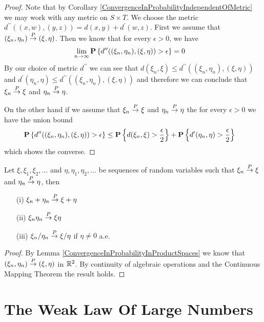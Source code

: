\begin{proof}
Note that by Corollary
\ref{ConvergenceInProbabilityIndependentOfMetric} we may work with any
metric on $S \times T$.  We choose the metric $d^{\prime\prime}((x,w), (y,z)) =
d(x,y) + d^\prime(w,z)$.
First we assume that $(\xi_n, \eta_n) \overset{P}\to (\xi, \eta)$.  Then we
know that for every $\epsilon > 0$, we have
\begin{align*}
\lim_{n \to \infty} \textbf{P}\left \{d^{\prime\prime}((\xi_n,\eta_n),
  (\xi, \eta)) > \epsilon \right \} &= 0
\end{align*}
By our choice of metric $d^{\prime\prime}$ we can see that $d(\xi_n,
\xi) \leq d^{\prime\prime}((\xi_n,\eta_n),
  (\xi, \eta))$ and $d^\prime(\eta_n,\eta) \leq d^{\prime\prime}((\xi_n,\eta_n),
  (\xi, \eta))$ and therefore we can conclude that $\xi_n \overset{P}\to \xi$
  and $\eta_n \overset{P}\to \eta$.  

On the other hand if we assume that  $\xi_n \overset{P}\to \xi$ and $\eta_n
\overset{P}\to \eta$ the for every $\epsilon > 0$ we have the union bound
\begin{align*}
\textbf{P}\left \{d^{\prime\prime}((\xi_n,\eta_n),
  (\xi, \eta)) > \epsilon \right \} &\leq \textbf{P}\left \{d(\xi_n,\xi) > \frac{\epsilon}{2} \right \}
  + \textbf{P}\left \{d^\prime(\eta_n,\eta) > \frac{\epsilon}{2} \right \}
\end{align*}
which shows the converse.
\end{proof}
\begin{cor}\label{ConvergenceInProbabilityAndAlgebraicOperations}Let $\xi, \xi_1, \xi_2, \dots$ and $\eta, \eta_1, \eta_2,
  \dots$ be sequences of random variables such that $\xi_n \overset{P}\to
  \xi$ and $\eta_n \overset{P}\to \eta$, then 
\begin{itemize}
\item[(i)] $\xi_n + \eta_n \overset{P}\to \xi + \eta$
\item[(ii)] $\xi_n  \eta_n \overset{P}\to \xi \eta$
\item[(iii)] $\xi_n / \eta_n \overset{P}\to \xi /\eta$ if $\eta \neq 0$ a.e.
\end{itemize}
\end{cor}
\begin{proof}
By Lemma \ref{ConvergenceInProbabilityInProductSpaces} we know that
$(\xi_n, \eta_n) \overset{P}\to (\xi, \eta)$ in $\mathbb{R}^2$.  By continuity of algebraic
operations and the Continuous Mapping Theorem the result holds.
\end{proof}


\section{The Weak Law Of Large Numbers}


